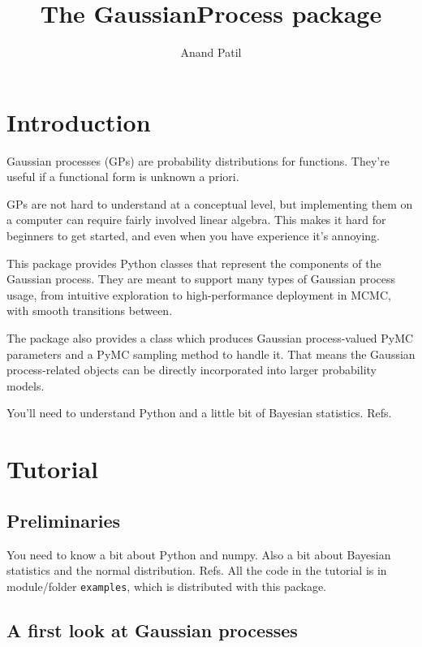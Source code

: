 \documentclass{manual}
\begin{document}
\title{The GaussianProcess package}
\author{Anand Patil}
\maketitle
\tableofcontents

\chapter{Introduction}\label{cha:introduction} %

Gaussian processes (GPs) are probability distributions for functions. They're useful if a functional form is unknown a priori.

GPs are not hard to understand at a conceptual level, but implementing them on a computer can require fairly involved linear algebra. This makes it hard for beginners to get started, and even when you have experience it's annoying.

This package provides Python classes that represent the components of the Gaussian process. They are meant to support many types of Gaussian process usage, from intuitive exploration to high-performance deployment in MCMC, with smooth transitions between.

The package also provides a class which produces Gaussian process-valued PyMC parameters and a PyMC sampling method to handle it. That means the Gaussian process-related objects can be directly incorporated into larger probability models.

You'll need to understand Python and a little bit of Bayesian statistics. Refs.


\chapter{Tutorial}\label{cha:tutorial} 

\section{Preliminaries}\label{sec:preliminaries}
You need to know a bit about Python and numpy. Also a bit about Bayesian statistics and the normal distribution. Refs. All the code in the tutorial is in module/folder \texttt{examples}, which is distributed with this package.

\section{A first look at Gaussian processes}\label{sec:first_look} %
\end{document}
